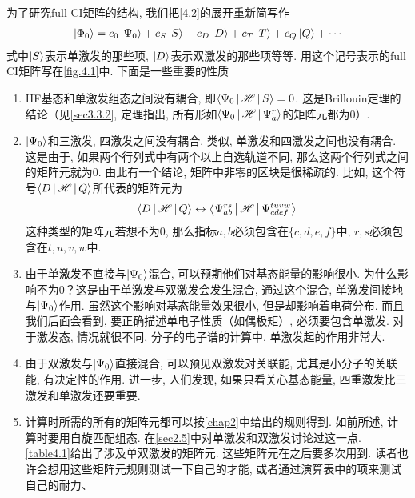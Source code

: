 为了研究full CI矩阵的结构, 我们把\eqref{4.2}的展开重新简写作
\begin{align}
\Ket{\Phi_0} = c_0\Ket{\Psi_0} + c_S\Ket{S}+c_D\Ket{D} + c_T\Ket{T} + c_Q\Ket{Q} + \cdots
\end{align}
式中$\Ket{S}$表示单激发的那些项, $\Ket{D}$表示双激发的那些项等等. 用这个记号表示的full CI矩阵写在\ref{fig.4.1}中. 下面是一些重要的性质
\begin{enumerate}[1.]
	\item HF基态和单激发组态之间没有耦合, 即$\Braket{\Psi_0|\mathscr{H}|S}=0$. 这是Brillouin定理的结论（见\ref{sec3.3.2}, 定理指出, 所有形如$\Braket{\Psi_0|\mathscr{H}|\Psi_a^r}$的矩阵元都为0）.
	\item
	$\Ket{\Psi_0}$和三激发, 四激发之间没有耦合. 类似, 单激发和四激发之间也没有耦合. 这是由于, 如果两个行列式中有两个以上自选轨道不同, 那么这两个行列式之间的\ha 矩阵元就为0. 由此有一个结论, 矩阵中非零的区块是很稀疏的. 比如, 这个符号$\Braket{D|\mathscr{H}|Q}$所代表的矩阵元为
	\begin{align*}
	\Braket{D|\mathscr{H}|Q} \leftrightarrow \Braket{\Psi_{ab}^{rs}|\mathscr{H}|\Psi_{cdef}^{tuvw}}
	\end{align*}
	这种类型的矩阵元若想不为0, 那么指标$a,b$必须包含在$\{c,d,e,f\}$中, $r,s$必须包含在$t,u,v,w$中.
	
	\item
	由于单激发不直接与$\Ket{\Psi_0}$混合, 可以预期他们对基态能量的影响很小. 为什么影响不为0？这是由于单激发与双激发会发生混合, 通过这个混合, 单激发间接地与$\Ket{\Psi_0}$作用. 虽然这个影响对基态能量效果很小, 但是却影响着电荷分布. 而且我们后面会看到, 要正确描述单电子性质（如偶极矩）, 必须要包含单激发. 对于激发态, 情况就很不同, 分子的电子谱的计算中, 单激发起的作用非常大.
	\item 
	由于双激发与$\Ket{\Psi_0}$直接混合, 可以预见双激发对关联能, 尤其是小分子的关联能, 有决定性的作用. 进一步, 人们发现, 如果只看关心基态能量, 四重激发比三激发和单激发还要重要.
	\item
	计算时所需的所有的矩阵元都可以按\ref{chap2}中给出的规则得到. 如前所述, 计算时要用自旋匹配组态. 在\ref{sec2.5}中对单激发和双激发讨论过这一点. \ref{table4.1}给出了涉及单双激发的矩阵元. 这些矩阵元在之后要多次用到. 读者也许会想用这些矩阵元规则测试一下自己的才能, 或者通过演算表中的项来测试自己的耐力、
\end{enumerate}
